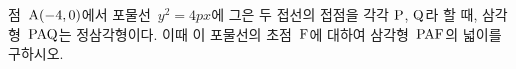 점~$\mathrm{A}(-4{,}\mkern3mu\mathopen{}0)$에서 포물선~$y^2=4px$에 그은 두 접선의 접점을 각각 $\mathrm{P}$, $\mathrm{Q}$라 할 때, 삼각형~$\mathrm{PAQ}$는 정삼각형이다. 이때 이 포물선의 초점~$\mathrm{F}$에 대하여 삼각형~$\mathrm{PAF}$의 넓이를 구하시오. 
